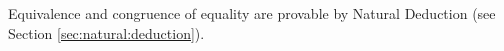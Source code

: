 %
\begin{lemma}\label{lemma:equivalence:congruence}
Equivalence and congruence of equality are provable by Natural Deduction (see Section \vref{sec:natural:deduction}).\end{lemma}
